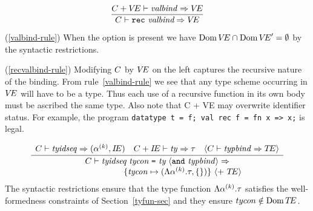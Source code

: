 \begin{equation}	%
\label{recvalbind-rule}
\frac{\C+\VE\ts\valbind\ra\VE}
     {\C\ts\recvalbind\ra\VE}
\end{equation}
\comments
\begin{description}
\item{(\ref{valbind-rule})}
When the option is present we have $\mathop{\rm Dom}\nolimits\mbox{$V\!E$}\cap
\mathop{\rm Dom}\nolimits\mbox{$V\!E$}' = \emptyset$ by the syntactic restrictions.
\item{(\ref{recvalbind-rule})}
Modifying $C$ by $\mbox{$V\!E$}$ on the left captures the 
recursive nature of the binding. From rule~\ref{valbind-rule} we see that any
type scheme occurring in $\mbox{$V\!E$}$ will have to be a type. Thus each use of a
recursive function in its own body must be ascribed the same type.
Also note that C + VE may overwrite identifier status. For example, the program \verb+datatype t = f; val rec f = fn x => x;+ is legal.
\end{description}

\begin{equation}	%
\frac{\begin{array}{lcr}
       \C\ts\tyidseq\ra(\alphak,{\IE}) &
       \C+\IE\ts\ty\ra\tau &
      \langle\C\ts\typbind\ra\TE\rangle
      \end{array}}
     {\begin{array}{c}
      \C\ts\longtypbind\ra\\
      \qquad\qquad\qquad
      \{\tycon\mapsto(\typetypefnc{\alphak}{\tau},\emptymap)\}\ 
             \langle +\ \TE\rangle 
      \end{array}
     }\index{29.3}
\end{equation}
\comment The syntactic restrictions ensure that the type function
$\Lambda{\ensuremath{\alpha^{(k)}}}.{\tau}$ satisfies the well-formedness constraints of  %
Section~\ref{tyfun-sec} and they ensure $tycon\notin\mathop{\rm Dom}\nolimits\mbox{$T\!E$}$.


